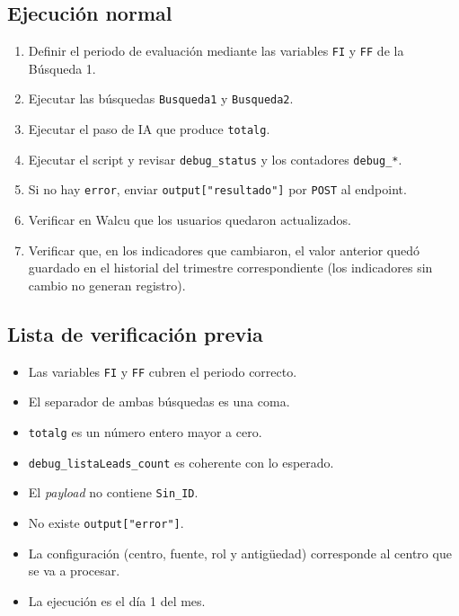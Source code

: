 \documentclass[11pt,a4paper]{article}
\newcommand{\code}[1]{\texttt{#1}}
\begin{document}
\subsection{Ejecución normal}
\begin{enumerate}[nosep]
  \item Definir el periodo de evaluación mediante las variables \code{FI} y \code{FF} de la Búsqueda 1.
  \item Ejecutar las búsquedas \code{Busqueda1} y \code{Busqueda2}.
  \item Ejecutar el paso de IA que produce \code{totalg}.
  \item Ejecutar el script y revisar \code{debug\_status} y los contadores \code{debug\_*}.
  \item Si no hay \code{error}, enviar \code{output["resultado"]} por \code{POST} al endpoint.
  \item Verificar en Walcu que los usuarios quedaron actualizados.
  \item Verificar que, en los indicadores que cambiaron, el valor anterior quedó guardado en el historial del trimestre correspondiente (los indicadores sin cambio no generan registro).
\end{enumerate}

\subsection{Lista de verificación previa}
\begin{itemize}[label=$\square$,nosep]
  \item Las variables \code{FI} y \code{FF} cubren el periodo correcto.
  \item El separador de ambas búsquedas es una coma.
  \item \code{totalg} es un número entero mayor a cero.
  \item \code{debug\_listaLeads\_count} es coherente con lo esperado.
  \item El \emph{payload} no contiene \code{Sin\_ID}.
  \item No existe \code{output["error"]}.
  \item La configuración (centro, fuente, rol y antigüedad) corresponde al centro que se va a procesar.
  \item La ejecución es el día 1 del mes.
\end{itemize}
\end{document}
